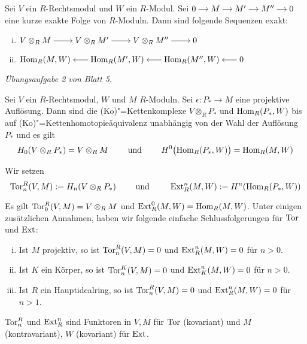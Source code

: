 \begin{lemma}
	Sei $V$ ein $R$-Rechtsmodul und $W$ ein $R$-Modul.
	Sei $\begin{tikzcd}[cramped,sep=small]
		0 \rar& M \rar &M' \rar & M'' \rar & 0
	\end{tikzcd}$ 
	eine kurze exakte Folge von $R$-Moduln.
	Dann sind folgende Sequenzen exakt:
	\begin{enumerate}[(i)]
		\item \( \begin{tikzcd}[cramped,sep=2.3em]
					V \otimes_R M \rar & V \otimes_R M' \rar & V \otimes_R M'' \rar & 0
				\end{tikzcd} \)
		\item $\begin{tikzcd}[cramped,sep=1.8em]
			\Hom_R(M,W)  & \Hom_R(M',W) \lar & \Hom_R(M'',W) \lar & 0 \lar
		\end{tikzcd}$
	\end{enumerate}
\end{lemma}
\begin{beweis}
	\emph{Übungsaufgabe 2 von Blatt 5.}
\end{beweis}

\begin{lemma}
	Sei $V$ ein $R$-Rechtsmodul, $W$ und $M$  $R$-Moduln.
	Sei $\epsilon \colon P_* \to M$ eine projektive Auflösung.
	Dann sind die (Ko)"=Kettenkomplexe $V \otimes_R P_*$ und $\Hom_R(P_*,W)$ bis auf (Ko)"=Kettenhomotopieäquivalenz unabhängig von der Wahl der Auflösung $P_*$ und es gilt
	\[
		H_0(V \otimes_R P_*) = V \otimes_R M \qquad \text{ und } \qquad H^0 \enbrace[\big]{\Hom_R(P_*,W)} = \Hom_R(M,W)
	\]
\end{lemma}

\noindent{}

\begin{definition}[{name=[Tor und Ext]}]
	Wir setzen
	\[
		\Tor_n^R(V,M) := H_n(V \otimes_R P_*) \qquad \text{ und } \qquad \Ext_R^n(M,W) := H^n \enbrace*{\Hom_R(P_*,W)} 
	\]
\end{definition}

\begin{bemerkung}
	Es gilt $\Tor_0^R(V,M) = V \otimes_R M$ und $\Ext_R^0(M,W)=\Hom_R(M,W)$.
	Unter einigen zusätzlichen Annahmen, haben wir folgende einfache Schlussfolgerungen für $\Tor$ und $\Ext$:
	\begin{enumerate}[(i)]
		\item Ist $M$ projektiv, so ist $\Tor_n^R(V,M)=0$ und $\Ext_R^n(M,W)=0$ für $n>0$.
		\item Ist $K$ ein Körper, so ist $\Tor_n^K(V,M)=0$ und $\Ext_K^n(M,W)=0$ für $n>0$.
		\item Ist $R$ ein Hauptidealring, so ist $\Tor_n^R(V,M)=0$ und $\Ext_R^n(M,W)=0$ für $n>1$.
	\end{enumerate}
	$\Tor^R_n$ und $\Ext_R^n$ sind Funktoren in $V,M$ für $\Tor$ (kovariant) und $M$ (kontravariant), $W$ (kovariant) für $\Ext$.
\end{bemerkung}

